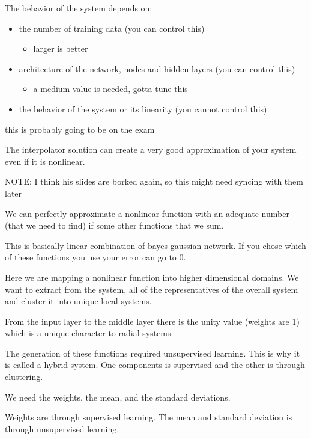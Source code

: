 \documentclass{article}
\begin{document}
The behavior of the system depends on:
\begin{itemize}
	\item the number of training data (you can control this)
	\begin{itemize}
		\item larger is better
	\end{itemize}
	\item architecture of the network, nodes and hidden layers (you can control this)
	\begin{itemize}
		\item a medium value is needed, gotta tune this
	\end{itemize}
	\item the behavior of the system or its linearity (you cannot control this)
\end{itemize}
this is probably going to be on the exam

The interpolator solution can create a very good approximation of your system even if it is nonlinear.

NOTE: I think his slides are borked again, so this might need syncing with them later

We can perfectly approximate a nonlinear function with an adequate number (that we need to find) if some other functions that we sum.

This is basically linear combination of bayes gaussian network. If you chose which of these functions you use your error can go to 0.


Here we are mapping a nonlinear function into higher dimensional domains. We want to extract from the system, all of the representatives of the overall system and cluster it into unique local systems.


From the input layer to the middle layer there is the unity value (weights are 1) which is a unique character to radial systems.



The generation of these functions required unsupervised learning. This is why it is called a hybrid system. One components is supervised and the other is through clustering.

We need the weights, the mean, and the standard deviations.

Weights are through supervised learning. The mean and standard deviation is through unsupervised learning.


\end{document}
